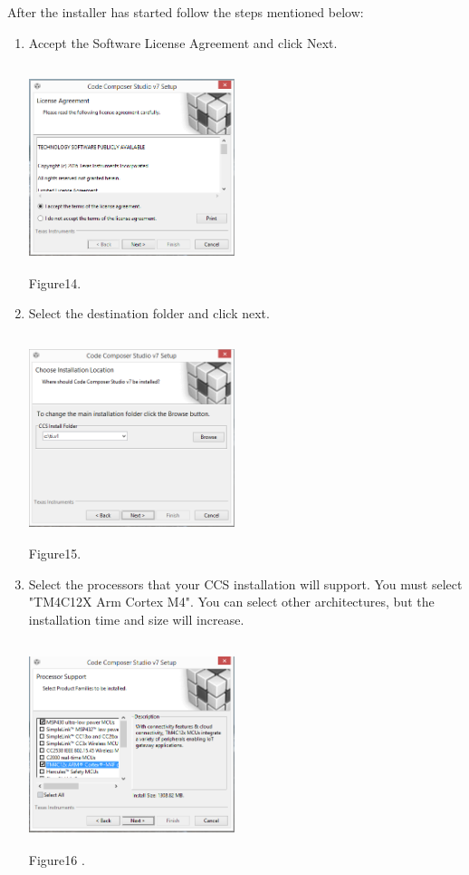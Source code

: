 \documentclass[a4paper,12pt,oneside]{book}
\begin{document}
\begin{itemize}
{After the installer has started follow the steps mentioned below:\\
\begin{enumerate}
	\item Accept the Software License Agreement and click Next.\\
	\begin{center}
		\includegraphics[width=6cm, height=6cm]{Images/CCSInstall1}\\
		Figure14.
	\end{center}
	\item Select the destination folder and click next.\\
	\begin{center}
		\includegraphics[width=6cm, height=6cm]{Images/CCSInstall2}\\
		Figure15.	
	\end{center}
	\item Select the processors that your CCS installation will support. You
	must select "TM4C12X Arm Cortex M4". You can select other architectures, but the installation time and size will increase.\\
	\begin{center}
		\includegraphics[width=6cm, height=6cm]{Images/CCSInstall3}	\\					Figure16 .

\end{center}
\end{enumerate}}
\end{itemize}
\end{document}
